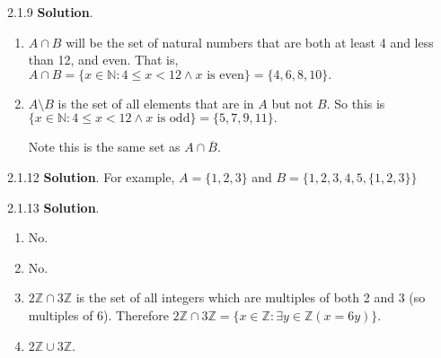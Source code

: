 \documentclass[11pt,]{book}
\theoremstyle{ptxplainnotitle}
\theoremstyle{ptxplaintitle}
\theoremstyle{ptxdefinitionnotitle}
\theoremstyle{ptxdefinitiontitle}
\theoremstyle{ptxdefinitionnotitle}
\theoremstyle{ptxdefinitiontitle}
\theoremstyle{ptxdefinitionnotitle}
\theoremstyle{ptxdefinitiontitle}
\theoremstyle{ptxdefinitiontitlenonumber}
\theoremstyle{ptxdefinitiontitlenonumber}
\numberwithin{equation}{chapter}
\newcommand{\N}{\mathbb N}
\newcommand{\Z}{\mathbb Z}
\newcommand{\st}{:}
\renewcommand{\bar}{\overline}
\newcommand{\lt}{<}
\begin{document}
\begin{divisionexercise}{2.1.9}
\textbf{Solution}.\quad%
\hypertarget{p-885}{}%
\leavevmode%
\begin{enumerate}[label=\alph*.]
\item\hypertarget{li-396}{}\hypertarget{p-886}{}%
\(A \cap B\) will be the set of natural numbers that are both at least 4 and less than 12, and even.  That is, \(A \cap B = \{x \in \N \st 4\le x \lt 12 \wedge x \text{ is even}\} = \{4, 6, 8, 10\}\text{.}\)%
\item\hypertarget{li-397}{}\hypertarget{p-887}{}%
\(A \setminus B\) is the set of all elements that are in \(A\) but not \(B\text{.}\)  So this is \(\{x \in \N \st 4 \le x \lt 12 \wedge x \text{ is odd}\} = \{5,7,9,11\}\text{.}\)%
\par
\hypertarget{p-888}{}%
Note this is the same set as \(A \cap \bar{B}\text{.}\)%
\end{enumerate}
%
\end{divisionexercise}%
\begin{divisionexercise}{2.1.12}
\textbf{Solution}.\quad%
\hypertarget{p-896}{}%
For example, \(A = \{1,2,3\}\) and \(B = \{1,2,3,4,5,\{1,2,3\}\}\)%
\end{divisionexercise}%
\begin{divisionexercise}{2.1.13}
\textbf{Solution}.\quad%
\hypertarget{p-902}{}%
\leavevmode%
\begin{enumerate}[label=(\alph*)]
\item\hypertarget{li-406}{}\hypertarget{p-903}{}%
No.%
\item\hypertarget{li-407}{}\hypertarget{p-904}{}%
No.%
\item\hypertarget{li-408}{}\(2\Z \cap 3\Z\) is the set of all integers which are multiples of both 2 and 3 (so multiples of 6). Therefore \(2\Z \cap 3\Z = \{x \in \Z \st \exists y\in \Z(x = 6y)\}\).%
\item\hypertarget{li-409}{}\(2\Z \cup 3\Z\).%
\end{enumerate}
%
\end{divisionexercise}%
\end{document}
